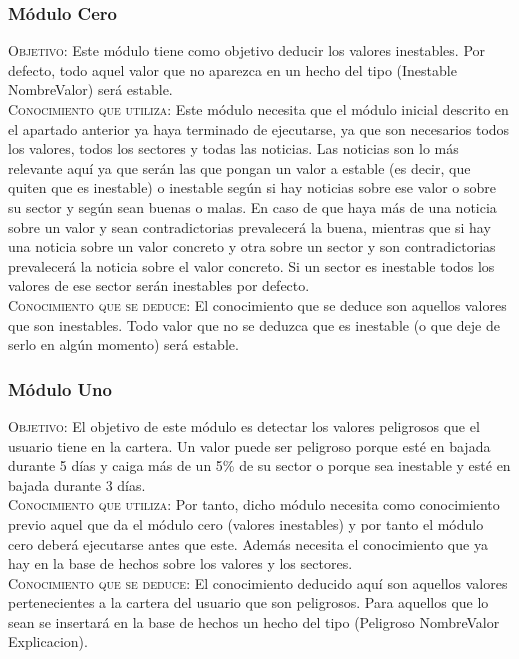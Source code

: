 \documentclass[12pt]{article}
\begin{document}
\subsubsection{Módulo Cero}
\textsc{Objetivo}: Este módulo tiene como objetivo deducir los valores inestables. Por defecto, todo aquel valor que no aparezca en un hecho del tipo (Inestable NombreValor) será estable.\\

\textsc{Conocimiento que utiliza}: Este módulo necesita que el módulo inicial descrito en el apartado anterior ya haya terminado de ejecutarse, ya que son necesarios todos los valores, todos los sectores y todas las noticias. Las noticias son lo más relevante aquí ya que serán las que pongan un valor a estable (es decir, que quiten que es inestable) o inestable según si hay noticias sobre ese valor o sobre su sector y según sean buenas o malas. En caso de que haya más de una noticia sobre un valor y sean contradictorias prevalecerá la buena, mientras que si hay una noticia sobre un valor concreto y otra sobre un sector y son contradictorias prevalecerá la noticia sobre el valor concreto. Si un sector es inestable todos los valores de ese sector serán inestables por defecto. \\

\textsc{Conocimiento que se deduce}: El conocimiento que se deduce son aquellos valores que son inestables. Todo valor que no se deduzca que es inestable (o que deje de serlo en algún momento) será estable.

\subsubsection{Módulo Uno}
\textsc{Objetivo}: El objetivo de este módulo es detectar los valores peligrosos que el usuario tiene en la cartera. Un valor puede ser peligroso porque esté en bajada durante 5 días y caiga más de un 5\% de su sector o porque sea inestable y esté en bajada durante 3 días. \\

\textsc{Conocimiento que utiliza}: Por tanto, dicho módulo necesita como conocimiento previo aquel que da el módulo cero (valores inestables) y por tanto el módulo cero deberá ejecutarse antes que este. Además necesita el conocimiento que ya hay en la base de hechos sobre los valores y los sectores.\\

\textsc{Conocimiento que se deduce}: El conocimiento deducido aquí son aquellos valores pertenecientes a la cartera del usuario que son peligrosos. Para aquellos que lo sean se insertará en la base de hechos un hecho del tipo (Peligroso NombreValor Explicacion).
\end{document}
